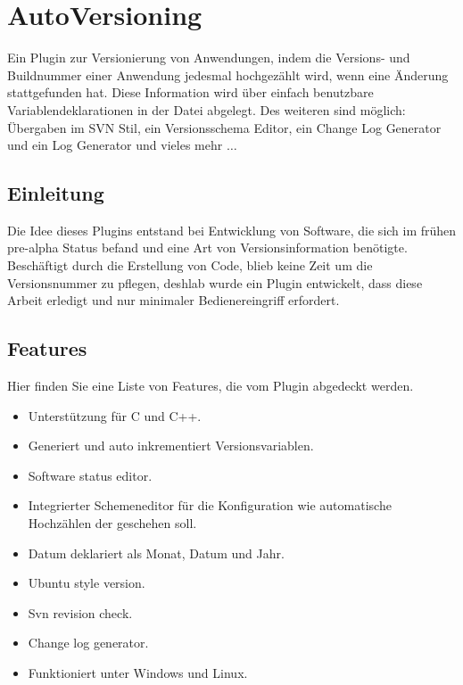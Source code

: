 \section{AutoVersioning}\label{sec:autoversioning}

Ein Plugin zur Versionierung von Anwendungen, indem die Versions- und Buildnummer einer Anwendung jedesmal hochgezählt wird, wenn eine Änderung stattgefunden hat. Diese Information wird über einfach benutzbare Variablendeklarationen in der Datei  abgelegt. Des weiteren sind möglich: Übergaben im SVN Stil, ein Versionsschema Editor, ein Change Log Generator und ein Log Generator und vieles mehr $\ldots$

\subsection{Einleitung}

Die Idee dieses Plugins entstand bei Entwicklung von Software, die sich im frühen pre-alpha Status befand und eine Art von Versionsinformation benötigte. Beschäftigt durch die Erstellung von Code, blieb keine Zeit um die Versionsnummer zu pflegen, deshlab wurde ein Plugin entwickelt, dass diese Arbeit erledigt und nur minimaler Bedienereingriff erfordert.

\subsection{Features}

Hier finden Sie eine Liste von Features, die vom Plugin abgedeckt werden.

\begin{itemize}
\item Unterstützung für C und C++.
\item Generiert und auto inkrementiert Versionsvariablen.
\item Software status editor.
\item Integrierter Schemeneditor für die Konfiguration wie automatische Hochzählen der  geschehen soll.
\item Datum deklariert als Monat, Datum und Jahr.
\item Ubuntu style version.
\item Svn revision check.
\item Change log generator.
\item Funktioniert unter Windows und Linux.
\end{itemize}

